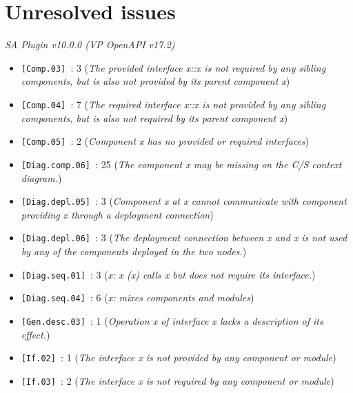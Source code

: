\section{Unresolved issues}\label{sec:checks}
\emph{SA Plugin v10.0.0 (VP OpenAPI v17.2)}
\begin{itemize}[nolistsep,noitemsep]
\item \texttt{[Comp.03] }: 3 (\emph{The provided interface x::x is not required by any sibling components, but is also not provided by its parent component x})

\item \texttt{[Comp.04] }: 7 (\emph{The required interface x::x is not provided by any sibling components, but is also not required by its parent component x})

\item \texttt{[Comp.05] }: 2 (\emph{Component x has no provided or required interfaces})

\item \texttt{[Diag.comp.06] }: 25 (\emph{The component x may be missing on the C/S context diagram.})

\item \texttt{[Diag.depl.05] }: 3 (\emph{Component x at x cannot communicate with component providing x through a deployment connection})

\item \texttt{[Diag.depl.06] }: 3 (\emph{The deployment connection between x and x is not used by any of the components deployed in the two nodes.})

\item \texttt{[Diag.seq.01] }: 3 (\emph{x: x (x) calls x but does not require its interface.})

\item \texttt{[Diag.seq.04] }: 6 (\emph{x: mixes components and modules})

\item \texttt{[Gen.desc.03] }: 1 (\emph{Operation x of interface x lacks a description of its effect.})

\item \texttt{[If.02] }: 1 (\emph{The interface x is not provided by any component or module})

\item \texttt{[If.03] }: 2 (\emph{The interface x is not required by any component or module})

\end{itemize}

%